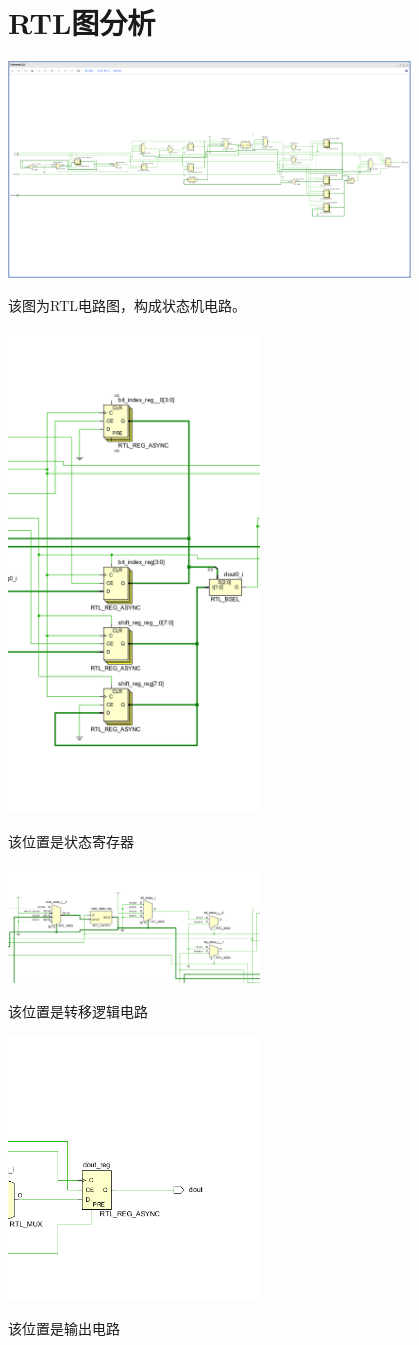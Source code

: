 \documentclass{article} %
\begin{document}
\section{RTL图分析}
\includegraphics[width=0.8\textwidth]{RTL.png}\par
该图为RTL电路图，构成状态机电路。\par
\includegraphics[width=0.5\textwidth]{11.png}\par
该位置是状态寄存器\par
\includegraphics[width=0.5\textwidth]{12.png}\par
该位置是转移逻辑电路\par
\includegraphics[width=0.5\textwidth]{13.png}\par
该位置是输出电路\par
\end{document}
